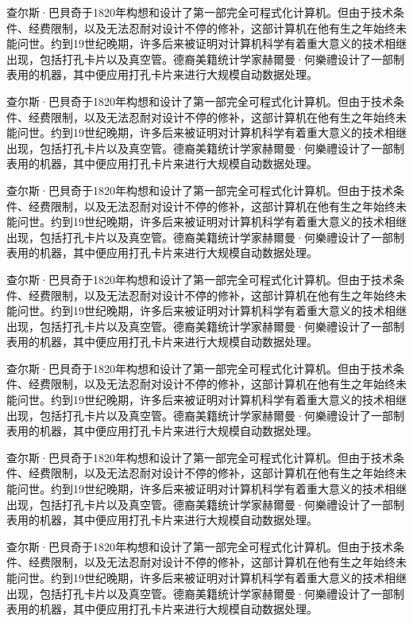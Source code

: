 \documentclass[twoside,a4paper,12pt]{book}%
\begin{document}
查尔斯·巴貝奇于1820年构想和设计了第一部完全可程式化计算机。但由于技术条件、经费限制，以及无法忍耐对设计不停的修补，这部计算机在他有生之年始终未能问世。约到19世纪晚期，许多后来被证明对计算机科学有着重大意义的技术相继出现，包括打孔卡片以及真空管。德裔美籍统计学家赫爾曼·何樂禮设计了一部制表用的机器，其中便应用打孔卡片来进行大规模自动数据处理。

查尔斯·巴貝奇于1820年构想和设计了第一部完全可程式化计算机。但由于技术条件、经费限制，以及无法忍耐对设计不停的修补，这部计算机在他有生之年始终未能问世。约到19世纪晚期，许多后来被证明对计算机科学有着重大意义的技术相继出现，包括打孔卡片以及真空管。德裔美籍统计学家赫爾曼·何樂禮设计了一部制表用的机器，其中便应用打孔卡片来进行大规模自动数据处理。

查尔斯·巴貝奇于1820年构想和设计了第一部完全可程式化计算机。但由于技术条件、经费限制，以及无法忍耐对设计不停的修补，这部计算机在他有生之年始终未能问世。约到19世纪晚期，许多后来被证明对计算机科学有着重大意义的技术相继出现，包括打孔卡片以及真空管。德裔美籍统计学家赫爾曼·何樂禮设计了一部制表用的机器，其中便应用打孔卡片来进行大规模自动数据处理。

查尔斯·巴貝奇于1820年构想和设计了第一部完全可程式化计算机。但由于技术条件、经费限制，以及无法忍耐对设计不停的修补，这部计算机在他有生之年始终未能问世。约到19世纪晚期，许多后来被证明对计算机科学有着重大意义的技术相继出现，包括打孔卡片以及真空管。德裔美籍统计学家赫爾曼·何樂禮设计了一部制表用的机器，其中便应用打孔卡片来进行大规模自动数据处理。

查尔斯·巴貝奇于1820年构想和设计了第一部完全可程式化计算机。但由于技术条件、经费限制，以及无法忍耐对设计不停的修补，这部计算机在他有生之年始终未能问世。约到19世纪晚期，许多后来被证明对计算机科学有着重大意义的技术相继出现，包括打孔卡片以及真空管。德裔美籍统计学家赫爾曼·何樂禮设计了一部制表用的机器，其中便应用打孔卡片来进行大规模自动数据处理。

查尔斯·巴貝奇于1820年构想和设计了第一部完全可程式化计算机。但由于技术条件、经费限制，以及无法忍耐对设计不停的修补，这部计算机在他有生之年始终未能问世。约到19世纪晚期，许多后来被证明对计算机科学有着重大意义的技术相继出现，包括打孔卡片以及真空管。德裔美籍统计学家赫爾曼·何樂禮设计了一部制表用的机器，其中便应用打孔卡片来进行大规模自动数据处理。

查尔斯·巴貝奇于1820年构想和设计了第一部完全可程式化计算机。但由于技术条件、经费限制，以及无法忍耐对设计不停的修补，这部计算机在他有生之年始终未能问世。约到19世纪晚期，许多后来被证明对计算机科学有着重大意义的技术相继出现，包括打孔卡片以及真空管。德裔美籍统计学家赫爾曼·何樂禮设计了一部制表用的机器，其中便应用打孔卡片来进行大规模自动数据处理。
\end{document}
